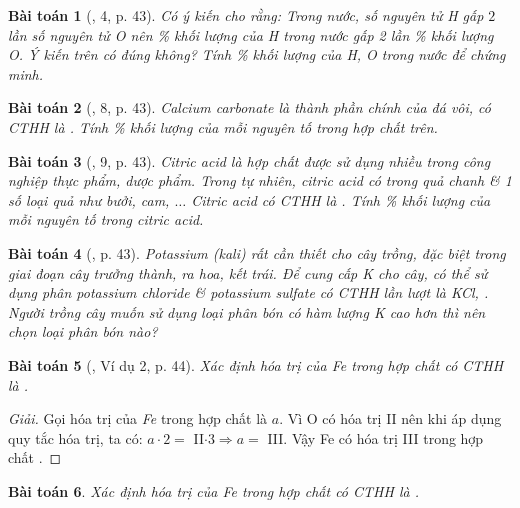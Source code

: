 \documentclass{article}
\newtheorem{baitoan}{Bài toán}
\begin{document}
\begin{baitoan}[\cite{SGK_KHTN_7_Canh_Dieu}, 4, p. 43]
	Có ý kiến cho rằng: Trong nước, số nguyên tử \emph{H} gấp $2$ lần số nguyên tử \emph{O} nên \% khối lượng của \emph{H} trong nước gấp 2 lần \% khối lượng \emph{O}. Ý kiến trên có đúng không? Tính \% khối lượng của \emph{H, O} trong nước để chứng minh.
\end{baitoan}

\begin{baitoan}[\cite{SGK_KHTN_7_Canh_Dieu}, 8, p. 43]
	Calcium carbonate là thành phần chính của đá vôi, có CTHH là \emph{}. Tính \% khối lượng của mỗi nguyên tố trong hợp chất trên.
\end{baitoan}

\begin{baitoan}[\cite{SGK_KHTN_7_Canh_Dieu}, 9, p. 43]
	Citric acid là hợp chất được sử dụng nhiều trong công nghiệp thực phẩm, dược phẩm. Trong tự nhiên, citric acid có trong quả chanh \& 1 số loại quả như bưởi, cam, $\ldots$  Citric acid có CTHH là \emph{}. Tính \% khối lượng của mỗi nguyên tố trong citric acid.
\end{baitoan}

\begin{baitoan}[\cite{SGK_KHTN_7_Canh_Dieu}, p. 43]
	Potassium (kali) rất cần thiết cho cây trồng, đặc biệt trong giai đoạn cây trưởng thành, ra hoa, kết trái. Để cung cấp \emph{K} cho cây, có thể sử dụng phân potassium chloride \& potassium sulfate có CTHH lần lượt là \emph{KCl, }. Người trồng cây muốn sử dụng loại phân bón có hàm lượng \emph{K} cao hơn thì nên chọn loại phân bón nào?
\end{baitoan}

\begin{baitoan}[\cite{SGK_KHTN_7_Canh_Dieu}, Ví dụ 2, p. 44]
	Xác định hóa trị của \emph{Fe} trong hợp chất có CTHH là \emph{}.
\end{baitoan}

\begin{proof}[Giải]
	Gọi hóa trị của \emph{Fe} trong hợp chất là $a$. Vì O có hóa trị II nên khi áp dụng quy tắc hóa trị, ta có: $a\cdot2 =$ II$\cdot3\Rightarrow a =$ III. Vậy Fe có hóa trị III trong hợp chất .
\end{proof}

\begin{baitoan}
	Xác định hóa trị của \emph{Fe} trong hợp chất có CTHH là \emph{}.
\end{baitoan}
\end{document}

